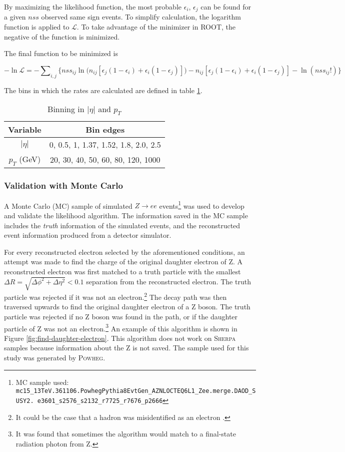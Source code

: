 By maximizing the likelihood function, the most probable $\epsilon_i$, $\epsilon_j$ can be found for a given $nss$ observed same sign events. To simplify calculation, the logarithm function is applied to $\mathcal{L}$. To take advantage of the minimizer in ROOT, the negative of the function is minimized. 

The final function to be minimized is 

\begin{equation}
-\ln \mathcal{L} = -\sum\nolimits_{i,j} \Big\{ {nss}_{ij} \ln\big(n_{ij}[\epsilon_j(1-\epsilon_i) + \epsilon_i(1-\epsilon_j)]\big) - n_{ij}[\epsilon_j(1-\epsilon_i) + \epsilon_i(1-\epsilon_j)] - \ln (nss_{ij}!) \Big\}
\end{equation} 

The bins in which the rates are calculated are defined in table \ref{table:binning}.

\begin{table}[h!]
\centering
\begin{tabular}{c | c}
\textbf{Variable} & \textbf{Bin edges} \\
\hline
$|\eta|$ & 0, 0.5, 1, 1.37, 1.52, 1.8, 2.0, 2.5 \\
$p_T$ (GeV) &  20, 30, 40, 50, 60, 80, 120, 1000
\end{tabular}
\caption{Binning in $|\eta|$ and $p_T$}
\label{table:binning}
\end{table}

\subsubsection*{Validation with Monte Carlo}
A Monte Carlo (MC) sample of simulated $Z \rightarrow ee$ events\footnote{MC sample used: \texttt{mc15\_13TeV.361106.PowhegPythia8EvtGen\_AZNLOCTEQ6L1\_Zee.merge.DAOD\_SUSY2. e3601\_s2576\_s2132\_r7725\_r7676\_p2666}}  was used to develop and validate the likelihood algorithm. The information saved in the MC sample includes the \textit{truth} information of the simulated events, and the reconstructed event information produced from a detector simulator. 

For every reconstructed electron selected by the aforementioned conditions, an attempt was made to find the charge of the original daughter electron of Z. A reconstructed electron was first matched to a truth particle with the smallest $\Delta R = \sqrt{\Delta \phi^2 + \Delta \eta^2} < 0.1$ separation from the reconstructed electron. The truth particle was rejected if it was not an electron.\footnote{It could be the case that a hadron was misidentified as an electron \cite{ElectronReco2011}.} The decay path was then traversed upwards to find the original daughter electron of a Z boson. The truth particle was rejected if no Z boson was found in the path, or if the daughter particle of Z was not an electron.\footnote{It was found that sometimes the algorithm would match to a final-state radiation photon from Z.} An example of this algorithm is shown in Figure \ref{fig:find-daughter-electron}. This algorithm does not work on \textsc{Sherpa} samples because information about the Z is not saved. The sample used for this study was generated by \textsc{Powheg}. 

